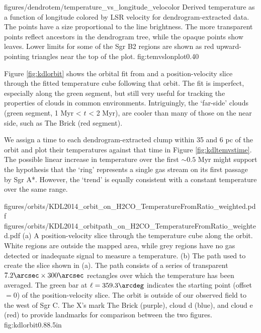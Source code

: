 \Figure
{figures/dendrotem/temperature_vs_longitude_velocolor}
{Derived temperature as a function of longitude colored by LSR velocity for
dendrogram-extracted data.  The points have a size proportional to the
\threeohthree line brightness.  The more transparent points reflect ancestors
in the dendrogram tree, while the opaque points show leaves.  Lower limits
for some of the Sgr B2 regions are shown as red upward-pointing triangles near
the top of the plot.}
{fig:temvslonplot}{0.4}{0}

Figure \ref{fig:kdlorbit} shows the orbital fit from \citet{Kruijssen2015a} and
a position-velocity slice through the fitted temperature cube following that
orbit.  The fit is imperfect, especially along the green segment, but still very useful
for tracking the properties of clouds in common environments.  Intriguingly,
the `far-side' clouds (green segment, 1 Myr < $t$ < 2 Myr), are cooler than
many of those on the near side, such as The Brick (red segment).  


We assign a time to each dendrogram-extracted clump within 35 \kms and 6 pc of
the \citet{Kruijssen2015a} orbit and plot their temperatures against that time
in Figure \ref{fig:kdltemvstime}.   The possible linear increase in temperature
over the first $\sim0.5$ Myr might support the \citet{Kruijssen2015a}
hypothesis that the `ring' represents a single gas stream on its first passage
by Sgr A*.  However, the `trend' is equally consistent with a constant
temperature over the same range. 

\RotFigureTwoAA
{figures/orbits/KDL2014_orbit_on_H2CO_TemperatureFromRatio_weighted.pdf}
{figures/orbits/KDL2014_orbitpath_on_H2CO_TemperatureFromRatio_weighted.pdf}
{(a) A position-velocity slice through the temperature cube along the
\citet{Kruijssen2015a} orbit.  White regions are outside the mapped area, while
grey regions have no gas detected or inadequate signal to measure a
temperature.
(b) The path used to create the slice shown in (a).  The path consists of a series
of transparent $7.2\arcsec\times300\arcsec$
rectangles over which the temperature has been averaged.  The green bar at
$\ell=359.3\arcdeg$ indicates the starting point (offset$=0$) of the position-velocity
slice.  The orbit is outside of our observed field to the west of Sgr C.  
The X's mark The Brick (purple), cloud d (blue), and cloud e (red) to provide
landmarks for comparison between the two figures.
}
{fig:kdlorbit}{0.8}{8.5in}

